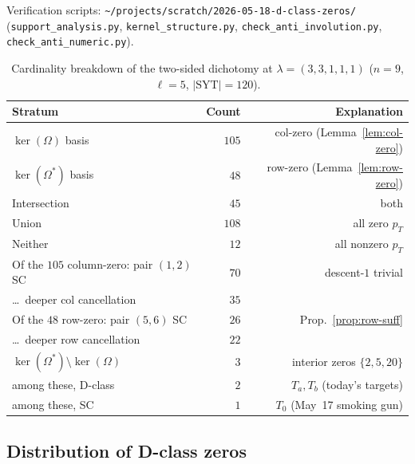 \documentclass[11pt]{article}
\theoremstyle{definition}
\newcommand{\Om}{\Omega}
\newcommand{\Omstar}{\Omega^{\ast}}
\newcommand{\SYT}{\mathrm{SYT}}
\newcommand{\pT}{p_T}
\begin{document}
Verification scripts: \texttt{\textasciitilde/projects/scratch/2026-05-18-d-class-zeros/}
(\texttt{support\_analysis.py}, \texttt{kernel\_structure.py},
\texttt{check\_anti\_involution.py},
\texttt{check\_anti\_numeric.py}).

\begin{table}[h]
\centering\renewcommand{\arraystretch}{1.2}
\caption{Cardinality breakdown of the two-sided dichotomy at
$\lambda = (3,3,1,1,1)$ ($n = 9$, $\ell = 5$, $|\SYT| = 120$).}
\begin{tabular}{lrr}
\toprule
Stratum & Count & Explanation \\
\midrule
$\ker(\Om)$ basis & $105$ & col-zero (Lemma~\ref{lem:col-zero}) \\
$\ker(\Omstar)$ basis & $48$ & row-zero (Lemma~\ref{lem:row-zero}) \\
Intersection & $45$ & both \\
Union & $108$ & all zero $\pT$ \\
Neither & $12$ & all nonzero $\pT$ \\
\midrule
Of the $105$ column-zero: pair $(1,2)$ SC & $70$ & descent-$1$ trivial \\
\quad\ldots\ deeper col cancellation & $35$ &  \\
Of the $48$ row-zero: pair $(5,6)$ SC & $26$ & Prop.~\ref{prop:row-suff} \\
\quad\ldots\ deeper row cancellation & $22$ &  \\
\midrule
$\ker(\Omstar) \setminus \ker(\Om)$ & $3$ & interior zeros $\{2, 5, 20\}$ \\
\quad among these, D-class & $2$ & $T_a, T_b$ (today's targets) \\
\quad among these, SC & $1$ & $T_0$ (May~17 smoking gun) \\
\bottomrule
\end{tabular}
\end{table}

\subsection{Distribution of D-class zeros}
\end{document}
